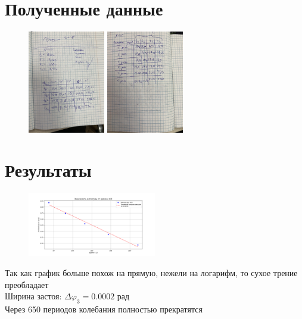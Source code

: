 \documentclass[a4paper]{article}
\begin{document}
\section{\textbf{Полученные данные}}

\begin{figure}[H]
\centering
\includegraphics[width=0.3\textwidth]{data_1}
\includegraphics[width=0.3\textwidth]{data_2}
\end{figure}

\section{\textbf{Результаты}}


\begin{figure}[H]
\centering
\includegraphics[width=0.5\textwidth]{4.png}
\end{figure}
Так как график больше похож на прямую, нежели на логарифм, то сухое трение преобладает\\
Ширина застоя: $\Delta \varphi_3 = 0.0002$ рад\\
Через 650 периодов колебания полностью прекратятся
\end{document}

